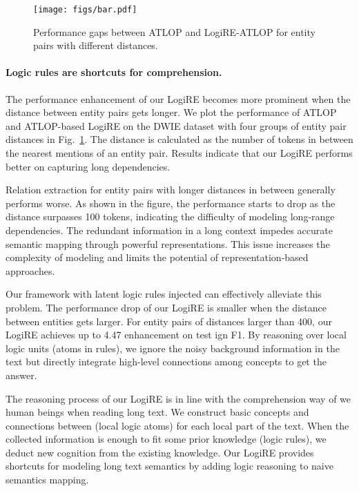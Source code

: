 \documentclass[11pt]{article}
\newcommand{\mymodel}{LogiRE\xspace}
\begin{document}
\begin{figure}
    \centering
    \texttt{[image: figs/bar.pdf]}
    \caption{Performance gaps between ATLOP and \mymodel-ATLOP for entity pairs with different distances.}
    \label{fig:distance}
\end{figure}

\paragraph{Logic rules are shortcuts for comprehension.}
The performance enhancement of our \mymodel becomes more prominent when the distance between entity pairs gets longer. We plot the performance of ATLOP and ATLOP-based \mymodel on the DWIE dataset with four groups of entity pair distances in Fig.~\ref{fig:distance}. The distance is calculated as the number of tokens in between the nearest mentions of an entity pair. Results indicate that our \mymodel performs better on capturing long dependencies.

Relation extraction for entity pairs with longer distances in between generally performs worse. As shown in the figure, the performance starts to drop as the distance surpasses 100 tokens, indicating the difficulty of modeling long-range dependencies. The redundant information in a long context impedes accurate semantic mapping through powerful representations. This issue increases the complexity of modeling and limits the potential of representation-based approaches.

Our framework with latent logic rules injected can effectively alleviate this problem. The performance drop of our \mymodel is smaller when the distance between entities gets larger. For entity pairs of distances larger than 400, our \mymodel achieves up to 4.47 enhancement on test ign F1. By reasoning over local logic units (atoms in rules), we ignore the noisy background information in the text but directly integrate high-level connections among concepts to get the answer.

The reasoning process of our \mymodel is in line with the comprehension way of we human beings when reading long text. We construct basic concepts and connections between (local logic atoms) for each local part of the text. When the collected information is enough to fit some prior knowledge (logic rules), we deduct new cognition from the existing knowledge. Our \mymodel provides shortcuts for modeling long text semantics by adding logic reasoning to naive semantics mapping.
\end{document}
